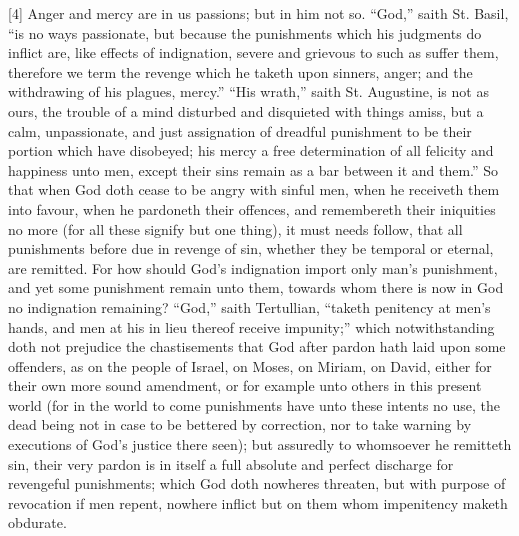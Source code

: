 [4] Anger and mercy are in us passions; but in him not so. “God,” saith St. Basil, “is no ways passionate, but because the punishments which his judgments do inflict are, like effects of indignation, severe and grievous to such as suffer them, therefore we term the revenge which he taketh upon sinners, anger; and the withdrawing of his plagues, mercy.” “His wrath,” saith St. Augustine, is not as ours, the trouble of a mind disturbed and disquieted with things amiss, but a calm, unpassionate, and just assignation of dreadful punishment to be their portion which have disobeyed; his mercy a free determination of all felicity and happiness unto men, except their sins remain as a bar between it and them.” So that when God doth cease to be angry with sinful men, when he receiveth them into favour, when he pardoneth their offences, and remembereth their iniquities no more (for all these signify but one thing), it must needs follow, that all punishments before due in revenge of sin, whether they be temporal or eternal, are remitted. For how should God’s indignation import only man’s punishment, and yet some punishment remain unto them, towards whom there is now in God no indignation remaining? “God,” saith Tertullian, “taketh penitency at men’s hands, and men at his in lieu thereof receive impunity;” which notwithstanding doth not prejudice the chastisements that God after pardon hath laid upon some offenders, as on the people of Israel, on Moses, on Miriam, on David, either for their own more sound amendment, or  for example unto others in this present world (for in the world to come punishments have unto these intents no use, the dead being not in case to be bettered by correction, nor to take warning by executions of God’s justice there seen); but assuredly to whomsoever he remitteth sin, their very pardon is in itself a full absolute and perfect discharge for revengeful punishments; which God doth nowheres threaten, but with purpose of revocation if men repent, nowhere inflict but on them whom impenitency maketh obdurate.


